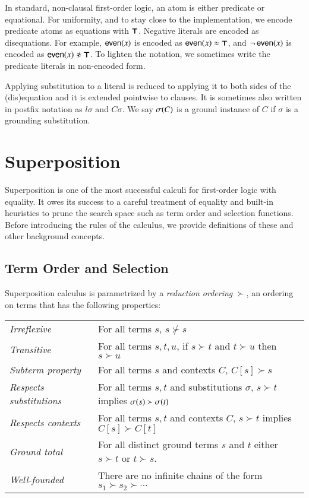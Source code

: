 In standard, non-clausal first-order logic, an atom is either
predicate or equational. For uniformity, and to
stay close to the implementation, we encode predicate atoms as equations with
$\pmb\top$. Negative literals are encoded as disequations. For example,
$\mathsf{even}(x)$ is encoded as $\mathsf{even}(x) \approx \pmb\top$, and
$\neg\,\mathsf{even}(x)$ is encoded as $\neglit{\cst{even}(x)}$. To lighten the notation,
we sometimes write the predicate literals in non-encoded form.

Applying substitution to a literal is reduced to applying it to both sides of
the (dis)equa\-tion and it is extended pointwise to clauses. It is sometimes
also written in postfix notation as $l\sigma$ and $C\sigma$. We say
$\sigma(C)$ is a ground instance of $C$ if $\sigma$ is a grounding
substitution.

\section{Superposition}

Superposition is one of the most successful calculi for first-order logic with
equality. It owes its success to a careful treatment of equality and built-in
heuristics to prune the search space such as term order and selection functions.
Before introducing the rules of the calculus, we provide definitions of these and other
background concepts.

\subsection{Term Order and Selection}
\label{sec:pre:order}
Superposition calculus is parametrized by a {\em reduction ordering} $\succ$, an
ordering on terms that has the following properties:

\noindent\begin{tabular}{p{}p{}}
    \textit{Irreflexive} & For all terms $s$, $s \not\succ s$ \\
    \textit{Transitive} & For all terms $s, t, u$,  if $s\succ t$ and $t \succ u$ then $s \succ u$ \\ 
    \textit{Subterm property} & For all terms $s$ and contexts $C$, $C[s] \succ s$ \\
    \textit{Respects substitutions} & For all terms $s, t$ and substitutions $\sigma$, $s \succ t$ implies $\sigma(s) \succ \sigma(t)$ \\
    \textit{Respects contexts} & For all terms $s,t$ and contexts $C$, $s \succ t$ implies $C[s] \succ C[t]$ \\
    \textit{Ground total} & For all distinct
    ground terms $s$ and $t$ either $s \succ t$ or $t \succ s$. \\
    \textit{Well-founded} & There are no infinite chains of the form $s_1 \succ s_2 \succ \cdots$ 
\end{tabular}

